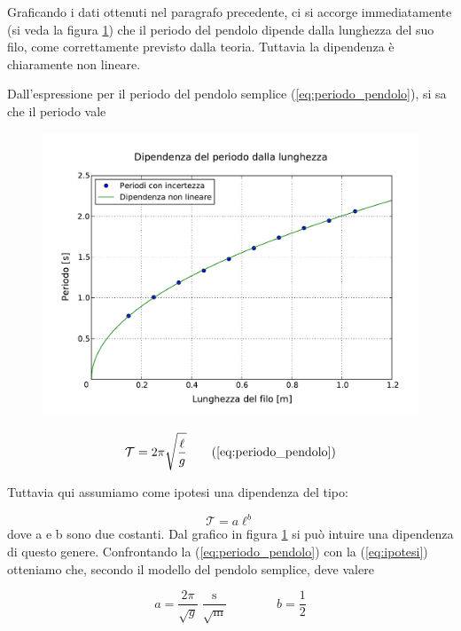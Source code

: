 Graficando i dati ottenuti nel paragrafo precedente, ci si accorge immediatamente (si veda
la figura \ref{fig:lunghezza_periodo}) che il periodo del pendolo dipende dalla lunghezza
del suo filo, come correttamente previsto dalla teoria. Tuttavia la dipendenza è chiaramente non lineare.

Dall'espressione per il periodo del pendolo semplice (\ref{eq:periodo_pendolo}), si sa che
il periodo vale

\begin{figure}
    \centering
    \includegraphics[width=120mm]{immagini/lunghezza_periodo.pdf}
    \caption{}
    \label{fig:lunghezza_periodo}
\end{figure}

\begin{equation}
    \mathcal{T} = 2\pi\sqrt{\frac{\ell}{g}}
    \tag{\ref{eq:periodo_pendolo}}
\end{equation}

Tuttavia qui assumiamo come ipotesi una dipendenza del tipo:

\begin{equation}
    \mathcal{T} = a\ell^b
    \label{eq:ipotesi}
\end{equation}
%
dove a e b sono due costanti. Dal grafico in figura \ref{fig:lunghezza_periodo} si può intuire una dipendenza di questo genere.
Confrontando la (\ref{eq:periodo_pendolo}) con la (\ref{eq:ipotesi}) otteniamo che, secondo il modello
del pendolo semplice, deve valere

\begin{equation}
    a = \frac{2\pi}{\sqrt{g}} \; \frac{\text{s}}{\sqrt{\text{m}}} \qquad \qquad b = \frac{1}{2}
\end{equation}

